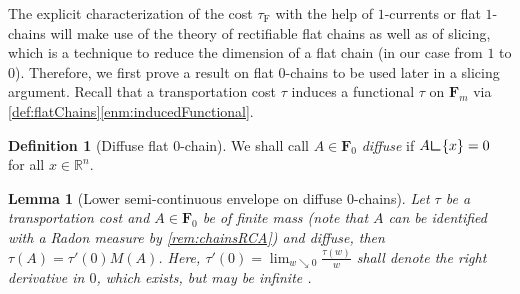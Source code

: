 \documentclass[10pt,a4paper,oneside,final]{article}
\newcommand{\R}{{\mathbb{R}}}
\newcommand{\restr}{{\mbox{\LARGE$\llcorner$}}}
\newcommand{\mass}[1]{M(#1)}
\newcommand{\flatChains}[1]{\mathbf F_{#1}}
\newcommand{\JEnXia}[1][\tau]{#1_{\mathrm{F}}}%
\numberwithin{equation}{section}
\theoremstyle{plain}
\newtheorem{lemma}[theorem]{Lemma}
\theoremstyle{definition}
\newtheorem{definition}[theorem]{Definition}
\theoremstyle{remark}
\begin{document}
The explicit characterization of the cost $\JEnXia$ with the help of $1$-currents or flat $1$-chains will make use of the theory of rectifiable flat chains as well as of slicing,
which is a technique to reduce the dimension of a flat chain (in our case from $1$ to $0$).
Therefore, we first prove a result on flat $0$-chains to be used later in a slicing argument.
Recall that a transportation cost $\tau$ induces a functional $\tau$ on $\flatChains m$ via \cref{def:flatChains}\eqref{enm:inducedFunctional}.

\begin{definition}[Diffuse flat $0$-chain]
We shall call $A\in\flatChains0$ \emph{diffuse} if $A\restr\{x\}=0$ for all $x\in\R^n$.
\end{definition}

\begin{lemma}[Lower semi-continuous envelope on diffuse $0$-chains]\label{thm:diffuse0chainCost}
Let $\tau$ be a transportation cost and $A\in\flatChains0$ be of finite mass (note that $A$ can be identified with a Radon measure by \cref{rem:chainsRCA}) and diffuse,
then $\tau(A)=\tau'(0)\mass{A}$. Here, $\tau'(0)=\lim_{w\searrow0}\frac{\tau(w)}w$ shall denote the right derivative in $0$, which exists, but may be infinite \cite[Thm.\,16.3.3]{Ku09}.
\end{lemma}
\end{document}
